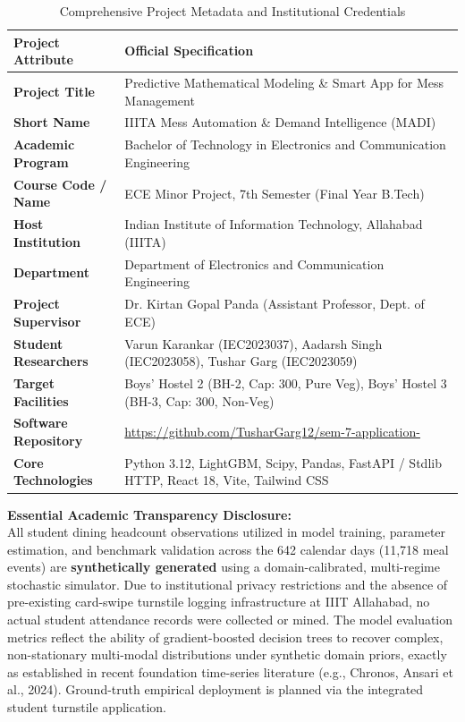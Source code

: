 \documentclass[11pt,a4paper,oneside]{report}
\begin{document}
\begin{table}[h]
\centering
\renewcommand{\arraystretch}{1.4}
\begin{tabularx}{\textwidth}{lX}
\toprule
\rowcolor{bluelight}
\textbf{Project Attribute} & \textbf{Official Specification} \\
\midrule
\textbf{Project Title} & Predictive Mathematical Modeling \& Smart App for Mess Management \\
\textbf{Short Name} & IIITA Mess Automation \& Demand Intelligence (MADI) \\
\textbf{Academic Program} & Bachelor of Technology in Electronics and Communication Engineering \\
\textbf{Course Code / Name} & ECE Minor Project, 7th Semester (Final Year B.Tech) \\
\textbf{Host Institution} & Indian Institute of Information Technology, Allahabad (IIITA) \\
\textbf{Department} & Department of Electronics and Communication Engineering \\
\textbf{Project Supervisor} & Dr. Kirtan Gopal Panda (Assistant Professor, Dept. of ECE) \\
\textbf{Student Researchers} & Varun Karankar (IEC2023037), Aadarsh Singh (IEC2023058), Tushar Garg (IEC2023059) \\
\textbf{Target Facilities} & Boys' Hostel 2 (BH-2, Cap: 300, Pure Veg), Boys' Hostel 3 (BH-3, Cap: 300, Non-Veg) \\
\textbf{Software Repository} & \url{https://github.com/TusharGarg12/sem-7-application-} \\
\textbf{Core Technologies} & Python 3.12, LightGBM, Scipy, Pandas, FastAPI / Stdlib HTTP, React 18, Vite, Tailwind CSS \\
\bottomrule
\end{tabularx}
\caption{Comprehensive Project Metadata and Institutional Credentials}
\end{table}

\begin{disclosurebox}
\textbf{Essential Academic Transparency Disclosure:}\\
All student dining headcount observations utilized in model training, parameter estimation, and benchmark validation across the 642 calendar days (11,718 meal events) are \textbf{synthetically generated} using a domain-calibrated, multi-regime stochastic simulator. Due to institutional privacy restrictions and the absence of pre-existing card-swipe turnstile logging infrastructure at IIIT Allahabad, no actual student attendance records were collected or mined. The model evaluation metrics reflect the ability of gradient-boosted decision trees to recover complex, non-stationary multi-modal distributions under synthetic domain priors, exactly as established in recent foundation time-series literature (e.g., Chronos, Ansari et al., 2024). Ground-truth empirical deployment is planned via the integrated student turnstile application.
\end{disclosurebox}
\end{document}
